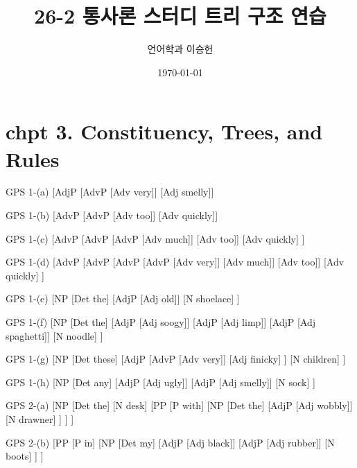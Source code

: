 \documentclass{article}
\begin{document}
\title{26-2 통사론 스터디 트리 구조 연습}
\author{언어학과 이승헌}
\date{\today}
\maketitle
\bigskip
\tableofcontents

\newpage
\section{chpt 3. Constituency, Trees, and Rules}
\bigskip

\noindent
\begin{gpstree}{GPS 1-(a)}
[AdjP [AdvP [Adv very]] [Adj smelly]]
\end{gpstree}%
\hfill
\begin{gpstree}{GPS 1-(b)}
[AdvP [AdvP [Adv too]] [Adv quickly]]
\end{gpstree}

\bigskip
\noindent
\begin{gpstree}{GPS 1-(c)}
[AdvP [AdvP [AdvP [Adv much]] [Adv too]]
      [Adv quickly]
]
\end{gpstree}%
\hfill
\begin{gpstree}{GPS 1-(d)}
[AdvP [AdvP [AdvP [AdvP [Adv very]]
                  [Adv much]]
            [Adv too]]     
      [Adv quickly]
]
\end{gpstree}

\bigskip
\noindent
\begin{gpstree}{GPS 1-(e)}
[NP
  [Det the]
  [AdjP 
    [Adj old]]
  [N shoelace] 
]
\end{gpstree}%
\hfill
\begin{gpstree}{GPS 1-(f)}
[NP
  [Det the]
  [AdjP [Adj soogy]]
  [AdjP [Adj limp]]
  [AdjP [Adj spaghetti]]
  [N noodle]
]
\end{gpstree}

\bigskip
\noindent
\begin{gpstree}{GPS 1-(g)}
[NP 
  [Det these]
  [AdjP 
    [AdvP [Adv very]]
    [Adj finicky]
    ]
  [N children]
]
\end{gpstree}%
\hfill
\begin{gpstree}{GPS 1-(h)}
[NP
  [Det any]
  [AdjP [Adj ugly]]
  [AdjP [Adj smelly]]
  [N sock]
]
\end{gpstree}

\newpage
\noindent
\begin{gpstree}{GPS 2-(a)}
[NP 
  [Det the]
  [N desk]
  [PP 
    [P with]
    [NP 
      [Det the]
      [AdjP [Adj wobbly]]
      [N drawner]  
    ]
  ]
]
\end{gpstree}%
\hfill
\begin{gpstree}{GPS 2-(b)}
[PP
  [P in]
  [NP 
    [Det my]
    [AdjP [Adj black]]
    [AdjP [Adj rubber]]
    [N boots]
  ]
]
\end{gpstree}
\end{document}
